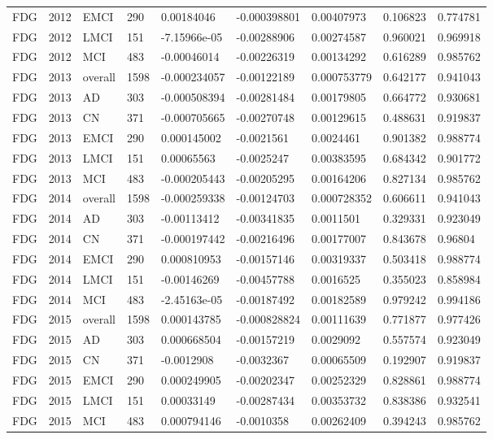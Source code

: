 \begin{landscape}
\begin{longtable}{lllllllll}
FDG & 2012 & EMCI & 290 & 0.00184046 & -0.000398801 & 0.00407973 & 0.106823 & 0.774781 \\
FDG & 2012 & LMCI & 151 & -7.15966e-05 & -0.00288906 & 0.00274587 & 0.960021 & 0.969918 \\
FDG & 2012 & MCI & 483 & -0.00046014 & -0.00226319 & 0.00134292 & 0.616289 & 0.985762 \\
FDG & 2013 & overall & 1598 & -0.000234057 & -0.00122189 & 0.000753779 & 0.642177 & 0.941043 \\
FDG & 2013 & AD & 303 & -0.000508394 & -0.00281484 & 0.00179805 & 0.664772 & 0.930681 \\
FDG & 2013 & CN & 371 & -0.000705665 & -0.00270748 & 0.00129615 & 0.488631 & 0.919837 \\
FDG & 2013 & EMCI & 290 & 0.000145002 & -0.0021561 & 0.0024461 & 0.901382 & 0.988774 \\
FDG & 2013 & LMCI & 151 & 0.00065563 & -0.0025247 & 0.00383595 & 0.684342 & 0.901772 \\
FDG & 2013 & MCI & 483 & -0.000205443 & -0.00205295 & 0.00164206 & 0.827134 & 0.985762 \\
FDG & 2014 & overall & 1598 & -0.000259338 & -0.00124703 & 0.000728352 & 0.606611 & 0.941043 \\
FDG & 2014 & AD & 303 & -0.00113412 & -0.00341835 & 0.0011501 & 0.329331 & 0.923049 \\
FDG & 2014 & CN & 371 & -0.000197442 & -0.00216496 & 0.00177007 & 0.843678 & 0.96804 \\
FDG & 2014 & EMCI & 290 & 0.000810953 & -0.00157146 & 0.00319337 & 0.503418 & 0.988774 \\
FDG & 2014 & LMCI & 151 & -0.00146269 & -0.00457788 & 0.0016525 & 0.355023 & 0.858984 \\
FDG & 2014 & MCI & 483 & -2.45163e-05 & -0.00187492 & 0.00182589 & 0.979242 & 0.994186 \\
FDG & 2015 & overall & 1598 & 0.000143785 & -0.000828824 & 0.00111639 & 0.771877 & 0.977426 \\
FDG & 2015 & AD & 303 & 0.000668504 & -0.00157219 & 0.0029092 & 0.557574 & 0.923049 \\
FDG & 2015 & CN & 371 & -0.0012908 & -0.0032367 & 0.00065509 & 0.192907 & 0.919837 \\
FDG & 2015 & EMCI & 290 & 0.000249905 & -0.00202347 & 0.00252329 & 0.828861 & 0.988774 \\
FDG & 2015 & LMCI & 151 & 0.00033149 & -0.00287434 & 0.00353732 & 0.838386 & 0.932541 \\
FDG & 2015 & MCI & 483 & 0.000794146 & -0.0010358 & 0.00262409 & 0.394243 & 0.985762 \\

\end{longtable}
\end{landscape}
